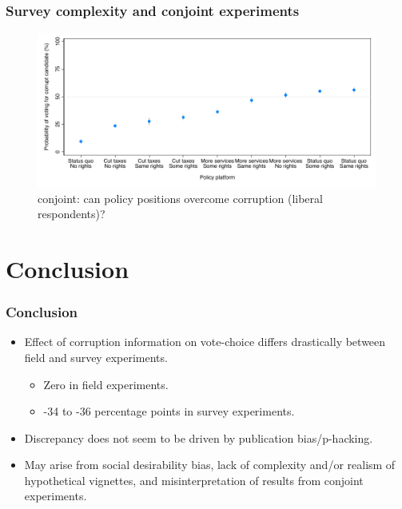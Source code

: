 \documentclass[usenames,dvipsnames]{beamer}
\begin{document}
\begin{frame}
\frametitle{Survey complexity and conjoint experiments}


\begin{figure}[!hb]
\hspace*{-11mm}
\includegraphics[scale = 0.77]{../figs/fz_margins_left.pdf}
\vspace{0.2cm}
\caption{\citet{franchino2015voting} conjoint: can policy positions overcome corruption (liberal respondents)?}
\small
\vspace{-0.5cm}
\label{fig: fz_margins_left}
\end{figure}

\end{frame}


\section{Conclusion}

\begin{frame}
\frametitle{Conclusion}
\begin{itemize}
\pause
\item Effect of corruption information on vote-choice \textcolor{Cerulean}{differs drastically} between field and survey experiments.
\begin{itemize}
\pause
\item \textcolor{Cerulean}{Zero} in field experiments.
\item \textcolor{Cerulean}{-34 to -36 percentage points} in survey experiments. 
\end{itemize}
\pause
\item Discrepancy does not seem to be driven by publication bias/p-hacking.
\pause
\item May arise from social desirability bias, lack of complexity and/or realism of hypothetical vignettes, and misinterpretation of results from conjoint experiments.

\end{itemize}
\end{frame}
\end{document}
